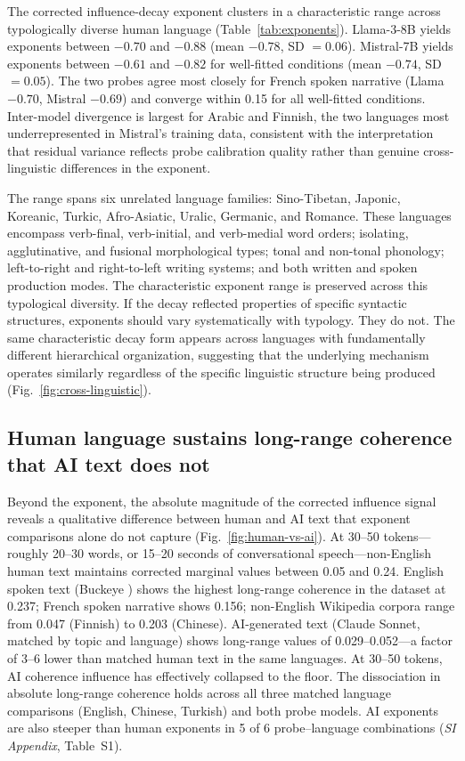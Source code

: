 \documentclass[9pt,twocolumn,twoside]{pnas-new}
\begin{document}
The corrected influence-decay exponent clusters in a characteristic range across typologically diverse human language (Table~\ref{tab:exponents}). Llama-3-8B yields exponents between $-0.70$ and $-0.88$ (mean $-0.78$, SD $= 0.06$). Mistral-7B yields exponents between $-0.61$ and $-0.82$ for well-fitted conditions (mean $-0.74$, SD $= 0.05$). The two probes agree most closely for French spoken narrative (Llama $-0.70$, Mistral $-0.69$) and converge within 0.15 for all well-fitted conditions. Inter-model divergence is largest for Arabic and Finnish, the two languages most underrepresented in Mistral's training data, consistent with the interpretation that residual variance reflects probe calibration quality rather than genuine cross-linguistic differences in the exponent.

The range spans six unrelated language families: Sino-Tibetan, Japonic, Koreanic, Turkic, Afro-Asiatic, Uralic, Germanic, and Romance. These languages encompass verb-final, verb-initial, and verb-medial word orders; isolating, agglutinative, and fusional morphological types; tonal and non-tonal phonology; left-to-right and right-to-left writing systems; and both written and spoken production modes. The characteristic exponent range is preserved across this typological diversity. If the decay reflected properties of specific syntactic structures, exponents should vary systematically with typology. They do not. The same characteristic decay form appears across languages with fundamentally different hierarchical organization, suggesting that the underlying mechanism operates similarly regardless of the specific linguistic structure being produced (Fig.~\ref{fig:cross-linguistic}).

\subsection*{Human language sustains long-range coherence that AI text does not}

Beyond the exponent, the absolute magnitude of the corrected influence signal reveals a qualitative difference between human and AI text that exponent comparisons alone do not capture (Fig.~\ref{fig:human-vs-ai}). At 30--50 tokens---roughly 20--30 words, or 15--20 seconds of conversational speech---non-English human text maintains corrected marginal values between 0.05 and 0.24. English spoken text (Buckeye \cite{pitt2005buckeye}) shows the highest long-range coherence in the dataset at 0.237; French spoken narrative shows 0.156; non-English Wikipedia corpora range from 0.047 (Finnish) to 0.203 (Chinese). AI-generated text (Claude Sonnet, matched by topic and language) shows long-range values of 0.029--0.052---a factor of 3--6 lower than matched human text in the same languages. At 30--50 tokens, AI coherence influence has effectively collapsed to the floor. The dissociation in absolute long-range coherence holds across all three matched language comparisons (English, Chinese, Turkish) and both probe models. AI exponents are also steeper than human exponents in 5 of 6 probe--language combinations (\emph{SI Appendix}, Table~S1).
\end{document}
